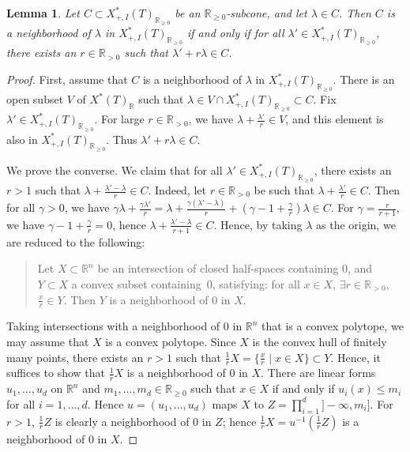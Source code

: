 \documentclass[11pt]{amsart}
\numberwithin{equation}{section}
\newtheorem{lemma}[theorem]{Lemma}
\theoremstyle{definition}
\theoremstyle{remark}
\newcommand{\RR}{\mathbb{R}}
\begin{document}
\begin{lemma}\label{lem-cone-topo}
Let $C\subset X^*_{+,I}(T)_{\RR_{\geq 0}}$ be an $\RR_{\geq 0}$-subcone, and let $\lambda\in C$. Then $C$ is a neighborhood of $\lambda$ in $X^*_{+,I}(T)_{\RR_{\geq 0}}$ if and only if for all $\lambda'\in X^*_{+,I}(T)_{\RR_{\geq 0}}$, there exists an $r\in \RR_{>0}$ such that $\lambda'+r\lambda \in C$.
\end{lemma}

\begin{proof}
First, assume that $C$ is a neighborhood of $\lambda$ in $X^*_{+,I}(T)_{\RR_{\geq 0}}$. There is an open subset $V$ of $X^*(T)_{\RR}$ such that $\lambda\in V\cap X^*_{+,I}(T)_{\RR_{\geq 0}} \subset C$. Fix $\lambda'\in X^*_{+,I}(T)_{\RR_{\geq 0}}$. For large $r\in \RR_{>0}$, we have $\lambda+\frac{\lambda'}{r}\in V$, and this element is also in $X^*_{+,I}(T)_{\RR_{\geq 0}}$. Thus $\lambda'+r\lambda \in C$.

We prove the converse. We claim that for all $\lambda'\in X^*_{+,I}(T)_{\RR_{\geq 0}}$, there exists an $r> 1$ such that $\lambda+\frac{\lambda'-\lambda}{r}\in C$. Indeed, let $r\in \RR_{>0}$ be such that $\lambda+\frac{\lambda'}{r}\in C$. Then for all $\gamma>0$, we have $\gamma\lambda + \frac{\gamma \lambda'}{r}=\lambda+\frac{\gamma(\lambda'-\lambda)}{r}+(\gamma-1+\frac{\gamma}{r})\lambda\in C$. For $\gamma=\frac{r}{r+1}$, we have $\gamma-1+\frac{\gamma}{r}=0$, hence $\lambda+\frac{\lambda'-\lambda}{r+1}\in C$. Hence, by taking $\lambda$ as the origin, we are reduced to the following: 
\begin{quote}
Let $X\subset \RR^n$ be an intersection of closed half-spaces 
containing $0$, and $Y \subset X$ a convex subset containing~$0$, satisfying: for all $x\in X$, $\exists r\in \RR_{>0}$, $\frac{x}{r}\in Y$. Then $Y$ is a neighborhood of $0$ in $X$. 
\end{quote}
Taking intersections with a neighborhood of $0$ in $\RR^n$ that is a convex polytope, we may assume that $X$ is a convex polytope. Since $X$ is the convex hull of finitely many points, there exists an $r>1$ such that $\frac{1}{r}X=\{\frac{x}{r} \mid x\in X\} \subset Y$. Hence, it suffices to show that $\frac{1}{r}X$ is a neighborhood of $0$ in $X$. There are linear forms $u_1, \dots , u_d$ on $\RR^n$ and $m_1, \dots , m_d\in \RR_{\geq 0}$ such that $x\in X$ if and only if $u_i(x)\leq  m_i$ for all $i=1, \dots, d$. Hence $u=(u_1, \dots , u_d )$ maps $X$ to $Z=\prod_{i=1}^d]-\infty, m_i]$. For $r>1$, $\frac{1}{r}Z$ is clearly a neighborhood of $0$ in $Z$; hence $\frac{1}{r}X=u^{-1}(\frac{1}{r}Z)$ is a neighborhood of $0$ in $X$.
\end{proof}
\end{document}
